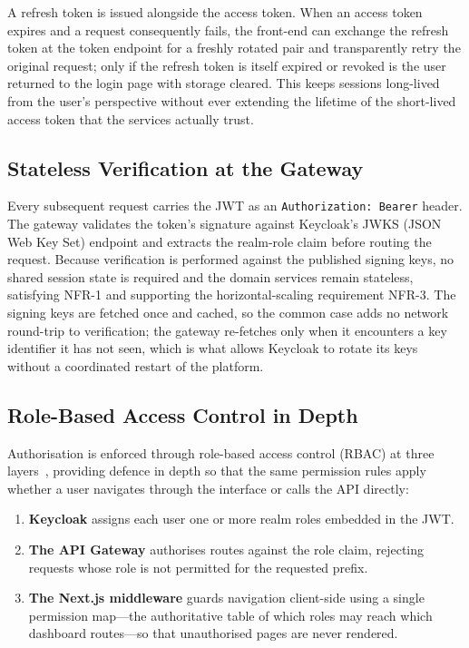 A refresh token is issued alongside the access token. When an access token expires and
a request consequently fails, the front-end can exchange the refresh token at the
token endpoint for a freshly rotated pair and transparently retry the original
request; only if the refresh token is itself expired or revoked is the user returned
to the login page with storage cleared. This keeps sessions long-lived from the user's
perspective without ever extending the lifetime of the short-lived access token that
the services actually trust.

\subsection{Stateless Verification at the Gateway}

Every subsequent request carries the JWT as an \texttt{Authorization: Bearer} header.
The gateway validates the token's signature against Keycloak's JWKS (JSON Web Key Set)
endpoint and extracts the realm-role claim before routing the request. Because
verification is performed against the published signing keys, no shared session state
is required and the domain services remain stateless, satisfying NFR-1 and supporting
the horizontal-scaling requirement NFR-3. The signing keys are fetched once and cached,
so the common case adds no network round-trip to verification; the gateway re-fetches
only when it encounters a key identifier it has not seen, which is what allows Keycloak
to rotate its keys without a coordinated restart of the platform.

\subsection{Role-Based Access Control in Depth}

Authorisation is enforced through role-based access control (RBAC) at three
layers~\cite{rbac}, providing defence in depth so that the same permission rules apply
whether a user navigates through the interface or calls the API directly:

\begin{enumerate}
  \item \textbf{Keycloak} assigns each user one or more realm roles embedded in the
  JWT.
  \item \textbf{The API Gateway} authorises routes against the role claim, rejecting
  requests whose role is not permitted for the requested prefix.
  \item \textbf{The Next.js middleware} guards navigation client-side using a single
  permission map---the authoritative table of which roles may reach which dashboard
  routes---so that unauthorised pages are never rendered.
\end{enumerate}


